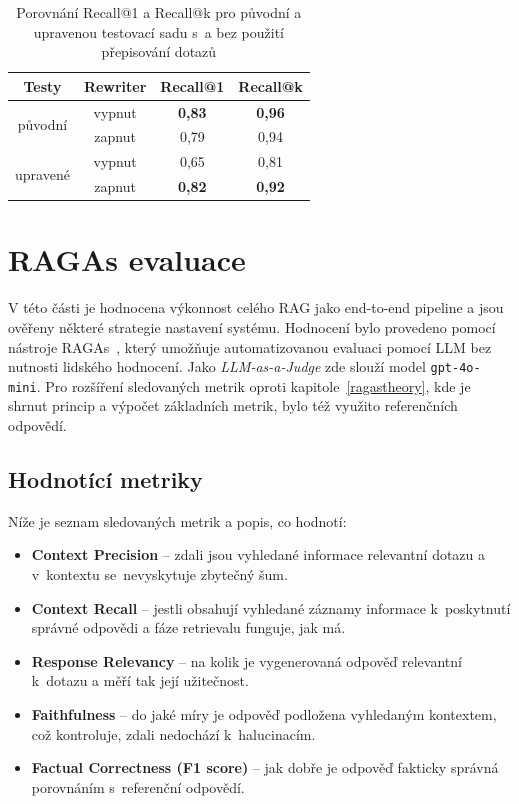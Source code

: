 \begin{table}[H]
    \centering
    \label{tab:rewriting_metrics_v2}
    \renewcommand{\arraystretch}{1.2}
    \begin{tabular}{|c|c|c|c|}
        \hline
        \textbf{Testy} & \textbf{Rewriter} & \textbf{Recall@1} & \textbf{Recall@k} \\
        \hline
        \multirow{2}{*}{původní}
        & vypnut & \textbf{0{,}83} & \textbf{0{,}96} \\
        & zapnut  & 0{,}79 & 0{,}94 \\
        \hline
        \multirow{2}{*}{upravené}
        & vypnut & 0{,}65 & 0{,}81 \\
        & zapnut  & \textbf{0{,}82} & \textbf{0{,}92} \\
        \hline
    \end{tabular}
    \caption{Porovnání Recall@1 a Recall@k pro původní a upravenou testovací sadu s~a bez použití přepisování dotazů}
\end{table}

\section{RAGAs evaluace}
\label{ragas_eval}
V této části je hodnocena výkonnost celého RAG jako end-to-end pipeline a jsou ověřeny některé strategie nastavení systému. Hodnocení bylo provedeno pomocí nástroje RAGAs~\cite{ragas}, který umožňuje automatizovanou evaluaci pomocí LLM bez nutnosti lidského hodnocení. Jako \textit{LLM-as-a-Judge} zde slouží model \texttt{gpt-4o-mini}. Pro rozšíření sledovaných metrik oproti kapitole~\ref{ragastheory}, kde je shrnut princip a výpočet základních metrik, bylo též využito referenčních odpovědí.

\subsection{Hodnotící metriky}
Níže je seznam sledovaných metrik a popis, co hodnotí:
\begin{itemize}
    \item \textbf{Context Precision} – zdali jsou vyhledané informace relevantní dotazu a v~kontextu se~nevyskytuje zbytečný šum.
    \item \textbf{Context Recall} – jestli obsahují vyhledané záznamy informace k~poskytnutí správné odpovědi a fáze retrievalu funguje, jak má.
    \item \textbf{Response Relevancy} – na kolik je vygenerovaná odpověď relevantní k~dotazu a měří tak její užitečnost.
    \item \textbf{Faithfulness} – do jaké míry je odpověď podložena vyhledaným kontextem, což kontroluje, zdali nedochází k~halucinacím.
    \item \textbf{Factual Correctness (F1 score)} – jak dobře je odpověď fakticky správná porovnáním s~referenční odpovědí.
\end{itemize}

